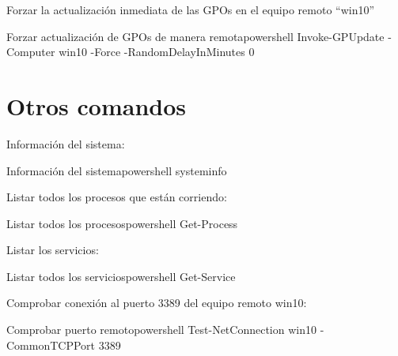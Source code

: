 Forzar la actualización inmediata de las GPOs en el equipo remoto “win10”
\begin{mycode}{Forzar actualización de GPOs de manera remota}{powershell}{}
Invoke-GPUpdate -Computer win10 -Force -RandomDelayInMinutes 0
\end{mycode}


\section{Otros comandos}
Información del sistema:
\begin{mycode}{Información del sistema}{powershell}{}
systeminfo
\end{mycode}

Listar todos los procesos que están corriendo:
\begin{mycode}{Listar todos los procesos}{powershell}{}
Get-Process
\end{mycode}

Listar los servicios:
\begin{mycode}{Listar todos los servicios}{powershell}{}
Get-Service
\end{mycode}


Comprobar conexión al puerto 3389 del equipo remoto win10:
\begin{mycode}{Comprobar puerto remoto}{powershell}{}
Test-NetConnection win10 -CommonTCPPort 3389
\end{mycode}
